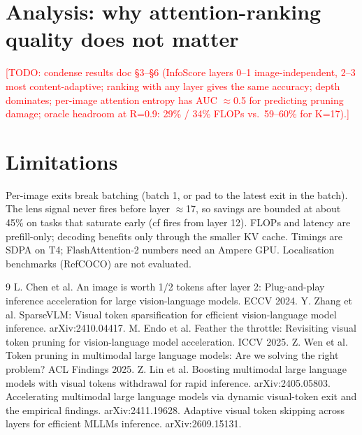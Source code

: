 \documentclass[10pt]{article}
\newcommand{\todo}[1]{\textcolor{red}{[TODO: #1]}}
\begin{document}
\section{Analysis: why attention-ranking quality does not matter}
\label{sec:analysis}
\todo{condense results doc \S3--\S6 (InfoScore layers 0--1 image-independent, 2--3 most content-adaptive; ranking
with any layer gives the same accuracy; depth dominates; per-image attention entropy has AUC $\approx$0.5 for
predicting pruning damage; oracle headroom at R=0.9: 29\% / 34\% FLOPs vs.\ 59--60\% for K=17).}

\section{Limitations}
Per-image exits break batching (batch 1, or pad to the latest exit in the batch). The lens signal never fires before
layer $\approx$17, so savings are bounded at about 45\% on tasks that saturate early (cf fires from layer 12). FLOPs
and latency are prefill-only; decoding benefits only through the smaller KV cache. Timings are SDPA on T4;
FlashAttention-2 numbers need an Ampere GPU. Localisation benchmarks (RefCOCO) are not evaluated.


\begin{thebibliography}{9}
 L. Chen et al. An image is worth 1/2 tokens after layer 2: Plug-and-play inference acceleration for large vision-language models. ECCV 2024.
 Y. Zhang et al. SparseVLM: Visual token sparsification for efficient vision-language model inference. arXiv:2410.04417.
 M. Endo et al. Feather the throttle: Revisiting visual token pruning for vision-language model acceleration. ICCV 2025.
 Z. Wen et al. Token pruning in multimodal large language models: Are we solving the right problem? ACL Findings 2025.
 Z. Lin et al. Boosting multimodal large language models with visual tokens withdrawal for rapid inference. arXiv:2405.05803.
 Accelerating multimodal large language models via dynamic visual-token exit and the empirical findings. arXiv:2411.19628.
 Adaptive visual token skipping across layers for efficient MLLMs inference. arXiv:2609.15131.
\end{thebibliography}
\end{document}
